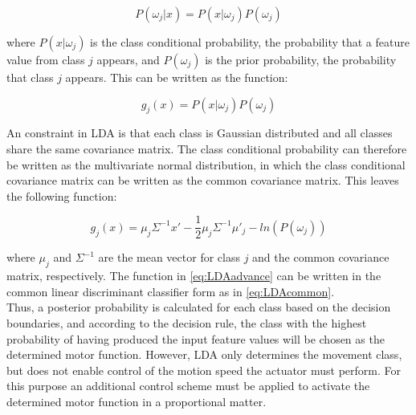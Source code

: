 \begin{equation}
	P(\omega_{j}|x) = P(x|\omega_{j})P(\omega_{j})
\end{equation}

where $P(x|\omega_{j})$ is the class conditional probability, the probability that a feature value from class $j$ appears, and $P(\omega_{j})$ is the prior probability, the probability that class $j$ appears. This can be written as the function:

\begin{equation}
	g_{j}(x) = P(x|\omega_{j})P(\omega_{j})
\end{equation}

An constraint in LDA is that each class is Gaussian distributed and all classes share the same covariance matrix. The class conditional probability can therefore be written as the multivariate normal distribution, in which the class conditional covariance matrix can be written as the common covariance matrix. This leaves the following function:

\begin{equation}\label{eq:LDAadvance}
	g_{j}(x) = \mu_{j}\Sigma^{-1}x'-\frac{1}{2}\mu_{j}\Sigma^{-1}\mu'_{j}-ln(P(\omega_{j}))
\end{equation}

where $\mu_{j}$ and $\Sigma^{-1}$ are the mean vector for class $j$ and the common covariance matrix, respectively. The function in \eqref{eq:LDAadvance} can be written in the common linear discriminant classifier form as in \eqref{eq:LDAcommon}. \cite{Scheme2013}\\
Thus, a posterior probability is calculated for each class based on the decision boundaries, and according to the decision rule, the class with the highest probability of having produced the input feature values will be chosen as the determined motor function. However, LDA only determines the movement class, but does not enable control of the motion speed the actuator must perform. For this purpose an additional control scheme must be applied to activate the determined motor function in a proportional matter. \cite{Fougner2012}

%
%
%

